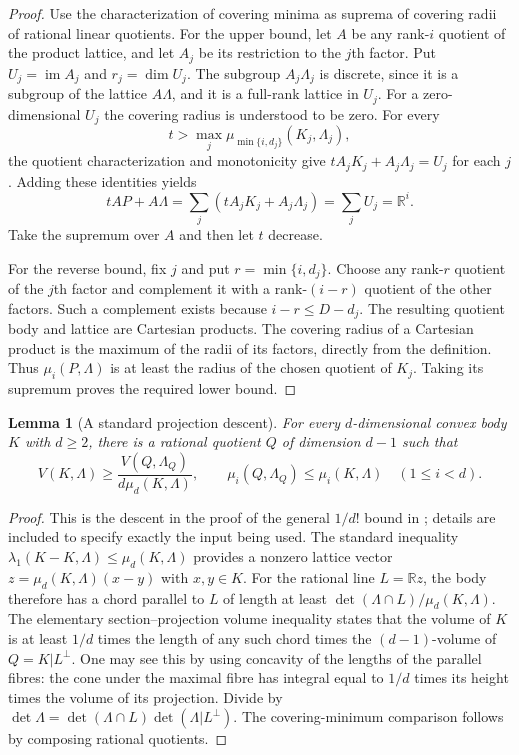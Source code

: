 \documentclass[11pt,a4paper]{article}
\newtheorem{lemma}[theorem]{Lemma}
\theoremstyle{remark}\newtheorem{remark}[theorem]{Remark}
\begin{document}
\begin{proof}
Use the characterization of covering minima as suprema of covering
radii of rational linear quotients. For the upper bound, let $A$ be any
rank-$i$ quotient of the product lattice, and let $A_j$ be its restriction
to the $j$th factor. Put $U_j=\operatorname{im}A_j$ and $r_j=\dim U_j$.
The subgroup $A_j\Lambda_j$ is discrete, since it is a subgroup of the
lattice $A\Lambda$, and it is a full-rank lattice in $U_j$.
For a zero-dimensional $U_j$ the covering radius is understood to be zero.
For every
\[
 t>\max_j\mu_{\min\{i,d_j\}}(K_j,\Lambda_j),
\]
the quotient characterization and monotonicity give
$tA_jK_j+A_j\Lambda_j=U_j$ for each $j$. Adding these identities yields
\[
 tAP+A\Lambda
 =\sum_j(tA_jK_j+A_j\Lambda_j)=\sum_jU_j=\mathbb R^i.
\]
Take the supremum over $A$ and then let $t$ decrease.

For the reverse bound, fix $j$ and put $r=\min\{i,d_j\}$.
Choose any rank-$r$ quotient of the $j$th factor and complement it with
a rank-$(i-r)$ quotient of the other factors. Such a complement exists
because $i-r\le D-d_j$. The resulting quotient body and lattice are
Cartesian products. The covering radius of a Cartesian product is the
maximum of the radii of its factors, directly from the definition.
Thus $\mu_i(P,\Lambda)$ is at least the radius of the chosen quotient
of $K_j$. Taking its supremum proves the required lower bound.
\end{proof}

\begin{lemma}[A standard projection descent]
\label{r4f:descent}
For every $d$-dimensional convex body $K$ with $d\ge2$, there is a
rational quotient $Q$ of dimension $d-1$ such that
\[
 V(K,\Lambda)\ge\frac{V(Q,\Lambda_Q)}{d\mu_d(K,\Lambda)},
 \qquad
 \mu_i(Q,\Lambda_Q)\le\mu_i(K,\Lambda)\quad(1\le i<d).
\]
\end{lemma}

\begin{proof}
This is the descent in the proof of the general $1/d!$ bound in
\cite{GMS}; details are included to specify exactly the input being used.
The standard inequality $\lambda_1(K-K,\Lambda)\le\mu_d(K,\Lambda)$
provides a nonzero lattice vector
$z=\mu_d(K,\Lambda)(x-y)$ with $x,y\in K$.
For the rational line $L=\mathbb Rz$, the body therefore has a chord
parallel to $L$ of length at least
$\det(\Lambda\cap L)/\mu_d(K,\Lambda)$.
The elementary section--projection volume inequality states that the
volume of $K$ is at least $1/d$ times the length of any such chord
times the $(d-1)$-volume of $Q=K|L^\perp$.
One may see this by using concavity of the lengths of the parallel
fibres: the cone under the maximal fibre has integral equal to $1/d$
times its height times the volume of its projection.
Divide by
$\det\Lambda=\det(\Lambda\cap L)\det(\Lambda|L^\perp)$.
The covering-minimum comparison follows by composing rational quotients.
\end{proof}
\end{document}
